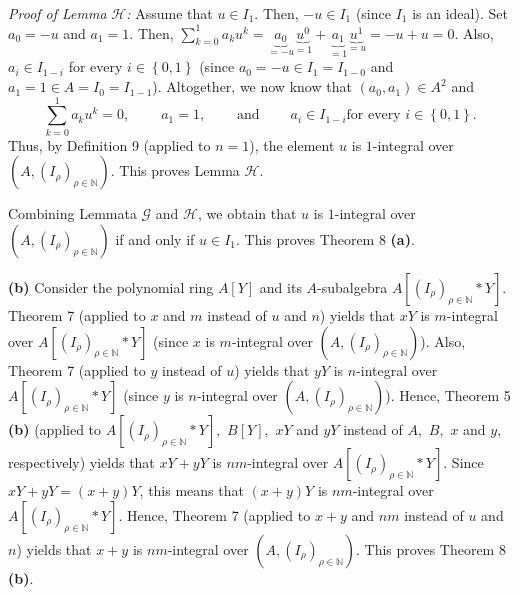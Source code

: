 \documentclass[12pt,final,notitlepage,onecolumn]{article}%
\begin{document}
\textit{Proof of Lemma }$\mathcal{H}$\textit{:} Assume that $u\in I_{1}$.
Then, $-u\in I_{1}$ (since $I_{1}$ is an ideal). Set $a_{0}=-u$ and $a_{1}=1$.
Then, $\sum\limits_{k=0}^{1}a_{k}u^{k}=\underbrace{a_{0}}_{=-u}%
\underbrace{u^{0}}_{=1}+\underbrace{a_{1}}_{=1}\underbrace{u^{1}}_{=u}%
=-u+u=0$. Also, $a_{i}\in I_{1-i}$ for every $i\in\left\{  0,1\right\}  $
(since $a_{0}=-u\in I_{1}=I_{1-0}$ and $a_{1}=1\in A=I_{0}=I_{1-1}$).
Altogether, we now know that $\left(  a_{0},a_{1}\right)  \in A^{2}$ and%
\[
\sum\limits_{k=0}^{1}a_{k}u^{k}=0,\ \ \ \ \ \ \ \ \ \ a_{1}%
=1,\ \ \ \ \ \ \ \ \ \ \text{and}\ \ \ \ \ \ \ \ \ \ a_{i}\in I_{1-i}\text{
for every }i\in\left\{  0,1\right\}  .
\]
Thus, by Definition 9 (applied to $n=1$), the element $u$ is $1$-integral over
$\left(  A,\left(  I_{\rho}\right)  _{\rho\in\mathbb{N}}\right)  $. This
proves Lemma $\mathcal{H}$.

Combining Lemmata $\mathcal{G}$ and $\mathcal{H}$, we obtain that $u$ is
$1$-integral over $\left(  A,\left(  I_{\rho}\right)  _{\rho\in\mathbb{N}%
}\right)  $ if and only if $u\in I_{1}$. This proves Theorem 8 \textbf{(a)}.

\textbf{(b)} Consider the polynomial ring $A\left[  Y\right]  $ and its
$A$-subalgebra $A\left[  \left(  I_{\rho}\right)  _{\rho\in\mathbb{N}}\ast
Y\right]  $. Theorem 7 (applied to $x$ and $m$ instead of $u$ and $n$) yields
that $xY$ is $m$-integral over $A\left[  \left(  I_{\rho}\right)  _{\rho
\in\mathbb{N}}\ast Y\right]  $ (since $x$ is $m$-integral over $\left(
A,\left(  I_{\rho}\right)  _{\rho\in\mathbb{N}}\right)  $). Also, Theorem 7
(applied to $y$ instead of $u$) yields that $yY$ is $n$-integral over
$A\left[  \left(  I_{\rho}\right)  _{\rho\in\mathbb{N}}\ast Y\right]  $ (since
$y$ is $n$-integral over $\left(  A,\left(  I_{\rho}\right)  _{\rho
\in\mathbb{N}}\right)  $). Hence, Theorem 5 \textbf{(b)} (applied to $A\left[
\left(  I_{\rho}\right)  _{\rho\in\mathbb{N}}\ast Y\right]  ,$ $B\left[
Y\right]  ,$ $xY$ and $yY$ instead of $A,$ $B,$ $x$ and $y$, respectively)
yields that $xY+yY$ is $nm$-integral over $A\left[  \left(  I_{\rho}\right)
_{\rho\in\mathbb{N}}\ast Y\right]  $. Since $xY+yY=\left(  x+y\right)  Y$,
this means that $\left(  x+y\right)  Y$ is $nm$-integral over $A\left[
\left(  I_{\rho}\right)  _{\rho\in\mathbb{N}}\ast Y\right]  $. Hence, Theorem
7 (applied to $x+y$ and $nm$ instead of $u$ and $n$) yields that $x+y$ is
$nm$-integral over $\left(  A,\left(  I_{\rho}\right)  _{\rho\in\mathbb{N}%
}\right)  $. This proves Theorem 8 \textbf{(b)}.
\end{document}
